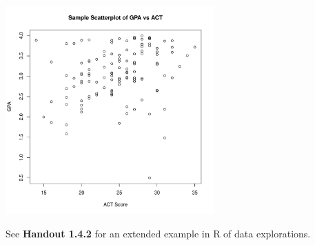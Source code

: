 \documentclass{article}\usepackage[]{graphicx}\usepackage[]{color}
\newenvironment{knitrout}{}{} %
\begin{document}
\begin{itemize}
\begin{knitrout}
{\centering \includegraphics[width=0.6\textwidth]{figure/unnamed-chunk-5-1} 

}



\end{knitrout}


\end{itemize} %

\nspace
See \textbf{Handout 1.4.2} for an extended example in R of data explorations.

















\end{document}
